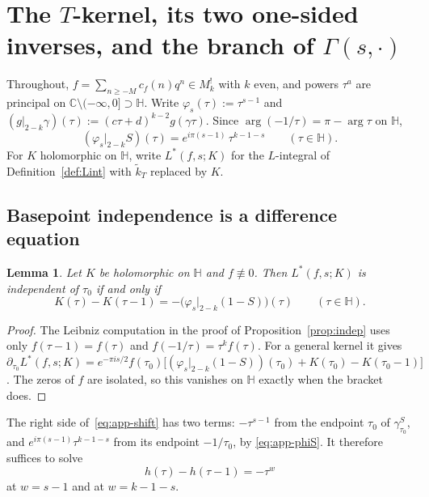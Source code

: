 \documentclass[11pt]{article}
\newtheorem{lemma}[theorem]{Lemma}
\newcommand{\HH}{\mathbb{H}}
\newcommand{\CC}{\mathbb{C}}
\newcommand{\tk}{\widetilde{k}_T}
\begin{document}
\appendix

\section{The $T$-kernel, its two one-sided inverses, and the branch of $\Gamma(s,\cdot)$}\label{app:branch}

Throughout, $f=\sum_{n\ge-M}c_f(n)q^n\in M^!_k$ with $k$ even, and powers $\tau^a$ are principal
on $\CC\setminus(-\infty,0]\supset\HH$. Write $\varphi_s(\tau):=\tau^{s-1}$ and
$(g|_{2-k}\gamma)(\tau):=(c\tau+d)^{k-2}g(\gamma\tau)$. Since $\arg(-1/\tau)=\pi-\arg\tau$ on $\HH$,
\begin{equation}\label{eq:app-phiS}
(\varphi_s|_{2-k}S)(\tau)=e^{i\pi(s-1)}\,\tau^{k-1-s}\qquad(\tau\in\HH).
\end{equation}
For $K$ holomorphic on $\HH$, write $L^*(f,s;K)$ for the $L$-integral of
Definition~\ref{def:Lint} with $\tk$ replaced by $K$.

\subsection{Basepoint independence is a difference equation}

\begin{lemma}\label{lem:app-shift}
Let $K$ be holomorphic on $\HH$ and $f\not\equiv0$. Then $L^*(f,s;K)$ is independent of $\tau_0$
if and only if
\begin{equation}\label{eq:app-shift}
K(\tau)-K(\tau-1)=-\big(\varphi_s|_{2-k}(1-S)\big)(\tau)\qquad(\tau\in\HH).
\end{equation}
\end{lemma}

\begin{proof}
The Leibniz computation in the proof of Proposition~\ref{prop:indep} uses only $f(\tau-1)=f(\tau)$
and $f(-1/\tau)=\tau^kf(\tau)$. For a general kernel it gives
$\partial_{\tau_0}L^*(f,s;K)=e^{-\pi is/2}f(\tau_0)\big[(\varphi_s|_{2-k}(1-S))(\tau_0)+K(\tau_0)-K(\tau_0-1)\big]$.
The zeros of $f$ are isolated, so this vanishes on $\HH$ exactly when the bracket does.
\end{proof}

The right side of~\eqref{eq:app-shift} has two terms: $-\tau^{s-1}$ from the endpoint $\tau_0$ of
$\gamma^S_{\tau_0}$, and $e^{i\pi(s-1)}\tau^{k-1-s}$ from its endpoint $-1/\tau_0$, by
\eqref{eq:app-phiS}. It therefore suffices to solve
\begin{equation}\label{eq:app-scalar}
h(\tau)-h(\tau-1)=-\tau^{w}
\end{equation}
at $w=s-1$ and at $w=k-1-s$.
\end{document}

